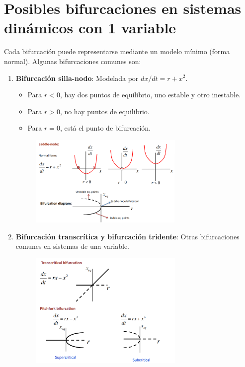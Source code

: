 \section{Posibles bifurcaciones en sistemas dinámicos con 1 variable}
Cada bifurcación puede representarse mediante un modelo mínimo (forma normal). Algunas bifurcaciones comunes son:
\begin{enumerate}
\item \textbf{Bifurcación silla-nodo}: Modelada por $dx/dt = r + x^2$. 
\begin{itemize}
\item Para $r < 0$, hay dos puntos de equilibrio, uno estable y otro inestable.
\item Para $r > 0$, no hay puntos de equilibrio.
\item Para $r = 0$, está el punto de bifurcación.
\end{itemize}

\begin{figure}[h]
\centering
\includegraphics[width = 0.7\textwidth]{figs/saddle-node.png}
\end{figure}

\item \textbf{Bifurcación transcrítica y bifurcación tridente}: Otras bifurcaciones comunes en sistemas de una variable.

\begin{figure}[h]
\centering
\includegraphics[width = 0.7\textwidth]{figs/bifurcacion-normal.png}
\end{figure}
\end{enumerate}

